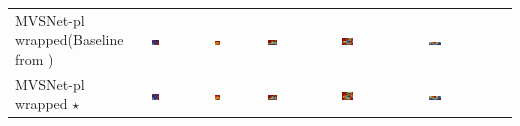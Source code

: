 \begin{longtable}{>{\tiny}M{25mm}M{26mm}M{26mm}M{26mm}M{26mm}M{26mm}}
            MVSNet-pl wrapped\newline(Baseline from \cite{Yao2018}) & \includegraphics[width=0.15\textwidth]{images/qualitatives/10_mvsnplbase/0000000-pred_depth_uncertainty.png} & \includegraphics[width=0.15\textwidth]{images/qualitatives/10_mvsnplbase/0000020-pred_depth_uncertainty.png} & \includegraphics[width=0.15\textwidth, trim={5cm 0 0 0},clip]{images/qualitatives/10_mvsnplbase/0000006-pred_depth_uncertainty.png} & \includegraphics[width=0.15\textwidth]{images/qualitatives/10_mvsnplbase/0000062-pred_depth_uncertainty.png} & \includegraphics[width=0.15\textwidth, trim={5cm 0 7.5cm 0},clip]{images/qualitatives/10_mvsnplbase/0000083-pred_depth_uncertainty.png}\\ 
            MVSNet-pl wrapped \(\star\) & \includegraphics[width=0.15\textwidth]{images/qualitatives/11_mvsnplbase_star/0000000-pred_depth_uncertainty.png} & \includegraphics[width=0.15\textwidth]{images/qualitatives/11_mvsnplbase_star/0000020-pred_depth_uncertainty.png} & \includegraphics[width=0.15\textwidth, trim={5cm 0 0 0},clip]{images/qualitatives/11_mvsnplbase_star/0000006-pred_depth_uncertainty.png} & \includegraphics[width=0.15\textwidth]{images/qualitatives/11_mvsnplbase_star/0000062-pred_depth_uncertainty.png} & \includegraphics[width=0.15\textwidth, trim={5cm 0 7.5cm 0},clip]{images/qualitatives/11_mvsnplbase_star/0000083-pred_depth_uncertainty.png}\\ 

\end{longtable}
